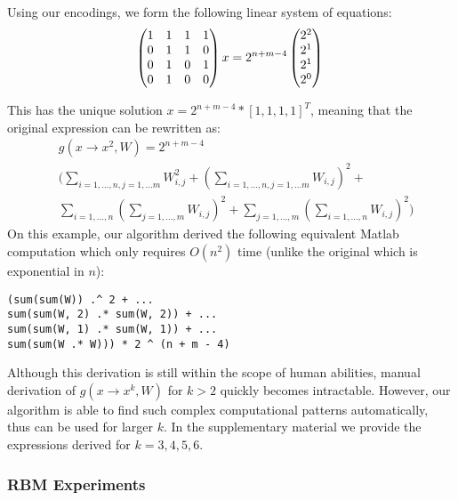Using our encodings, we form the following linear system of equations:
 \begin{equation}
 \begin{pmatrix} 
  1 & 1 & 1 & 1 \\ 
  0 & 1 & 1 & 0 \\ 
  0 & 1 & 0 & 1 \\ 
  0 & 1 & 0 & 0 \\     
\end{pmatrix}x = 2^{n + m - 4}\begin{pmatrix} 
  2^{2}\\ 
  2^{1}\\ 
  2^{1}\\ 
  2^{0}\\     
\end{pmatrix} \\
 \end{equation}

 This has the unique solution $x=2^{n + m - 4} * [1, 1, 1, 1]^T$, meaning that the original expression can be
rewritten as: 
\begin{align*}
	&g(x \rightarrow x^2, W) = 2^{n + m - 4} \\ 
 &\Big(\sum_{i = 1, \dots, n, j = 1, \dots m} W_{i, j}^2 + (\sum_{i = 1, \dots, n, j = 1, \dots m} W_{i, j})^2 + \\
 &\sum_{i = 1, \dots, n}(\sum_{j = 1, \dots, m} W_{i, j})^2 + \sum_{j = 1, \dots, m}(\sum_{i = 1, \dots, n} W_{i, j})^2 \Big)
\end{align*}
On this example, our algorithm derived the following equivalent Matlab
computation which only requires $O(n^2)$ time (unlike the original
which is exponential in $n$):
\begin{lstlisting}
(sum(sum(W)) .^ 2 + ...
sum(sum(W, 2) .* sum(W, 2)) + ... 
sum(sum(W, 1) .* sum(W, 1)) + ... 
sum(sum(W .* W))) * 2 ^ (n + m - 4)
\end{lstlisting}

Although this derivation is still within the scope of human abilities, manual derivation
of $g(x \rightarrow x^k, W)$ for $k > 2$ quickly becomes
intractable. However, our algorithm is able to find such complex
computational patterns automatically, thus can be used for larger
$k$. In the supplementary material we provide the expressions derived
for $k=3,4,5,6$.  

\subsubsection{RBM Experiments}

